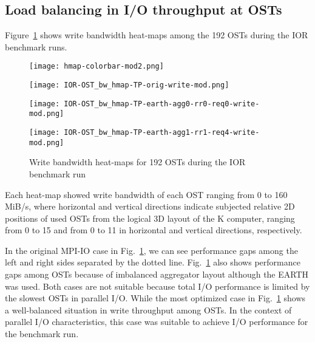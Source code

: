 \documentclass{jhps}
\begin{document}
\subsection{Load balancing in I/O throughput at OSTs}

Figure~\ref{fig:IOR_OST_BW_HMAP_WR} shows write bandwidth heat-maps
among the 192 OSTs during the IOR benchmark runs.
%
\begin{figure}[htb]
\begin{minipage}[t]{0.06\textwidth}
 \texttt{[image: hmap-colorbar-mod2.png]}
\end{minipage}
%
\noindent
\begin{minipage}[t]{0.3\textwidth}
 \centering
 \texttt{[image: IOR-OST\_bw\_hmap-TP-orig-write-mod.png]}
 \label{fig:IOR_OST_WR_ORIG}
\end{minipage}
%
\noindent
\begin{minipage}[t]{0.3\textwidth}
 \centering
 \texttt{[image: IOR-OST\_bw\_hmap-TP-earth-agg0-rr0-req0-write-mod.png]}
 \label{fig:IOR_OST_WR_AGG0_RR0_REQ0}
\end{minipage}
%
\noindent
\begin{minipage}[t]{0.3\textwidth}
 \centering
 \texttt{[image: IOR-OST\_bw\_hmap-TP-earth-agg1-rr1-req4-write-mod.png]}
 \label{fig:IOR_OST_WR_AGG1_RR1_REQ4}
\end{minipage}
%
\caption{Write bandwidth heat-maps for 192 OSTs during the IOR benchmark run}
\label{fig:IOR_OST_BW_HMAP_WR}
\end{figure}
%
Each heat-map showed write bandwidth of each OST ranging from 0 to 160 MiB/s,
where horizontal and vertical directions indicate subjected relative 2D positions
of used OSTs from the logical 3D layout of the K computer,
ranging from 0 to 15 and from 0 to 11 in horizontal and vertical directions, respectively.

In the original MPI-IO case in Fig.~\ref{fig:IOR_OST_BW_HMAP_WR},
we can see performance gaps among the left and right sides separated by
the dotted line.
Fig.~\ref{fig:IOR_OST_BW_HMAP_WR}
also shows performance gaps among OSTs
because of imbalanced aggregator layout although the EARTH was used.
Both cases are not suitable because total I/O performance is limited
by the slowest OSTs in parallel I/O.
While the most optimized case in
Fig.~\ref{fig:IOR_OST_BW_HMAP_WR}
shows a well-balanced situation in write throughput among OSTs.
In the context of parallel I/O characteristics, this case was suitable
to achieve I/O performance for the benchmark run.
\end{document}
